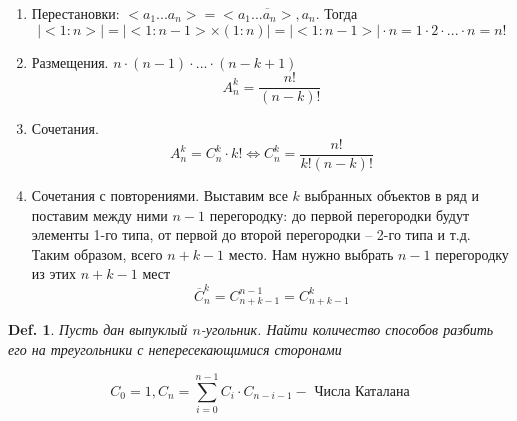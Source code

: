 \documentclass[12pt]{article}
\newenvironment{MyList}[1][4pt]{
  \begin{enumerate}[1.]
  \setlength{\parskip}{0pt}
  \setlength{\itemsep}{#1}
}{       
  \end{enumerate}
}
\def\EQ{\Leftrightarrow} %
\theoremstyle{definition} %
\theoremstyle{plain} %
\newtheorem{Def}[Thm]{Def.} %
\theoremstyle{remark} %
\begin{document}
\begin{MyList}
    \item Перестановки: $<a_1 ... a_n> = \overline{<a_1 ... a_n>, a_n}$. Тогда
    \[|<1:n>| = |<1:n - 1> \times (1:n)| = |<1:n - 1>| \cdot n = 1 \cdot 2 \cdot ... \cdot n = n!\]

    \item Размещения. $n \cdot (n - 1) \cdot ... \cdot (n - k + 1)$
    \[A_n^k = \frac{n!}{(n - k)!}\]

    \item Сочетания. 
    \[A_n^k = C_n^k \cdot k! \EQ C_n^k = \frac{n!}{k!(n - k)!}\]

    \item Сочетания с повторениями. Выставим все $k$ выбранных объектов в ряд и поставим между ними $n - 1$ перегородку: до первой перегородки будут элементы 1-го типа, от первой до второй перегородки -- 2-го типа и т.д.
    Таким образом, всего $n + k - 1$ место. Нам нужно выбрать $n - 1$ перегородку из этих $n + k - 1$ мест
    \[\overline{C}_n^k = C_{n + k - 1}^{n - 1} = C_{n + k - 1}^k\]
\end{MyList}

\begin{Def}
Пусть дан выпуклый $n$-угольник. Найти количество способов разбить его на треугольники с непересекающимися сторонами

\[C_0 = 1, C_n = \sum_{i=0}^{n - 1} C_i \cdot C_{n - i - 1} - \text{ Числа Каталана}\]

\end{Def}
\end{document}

